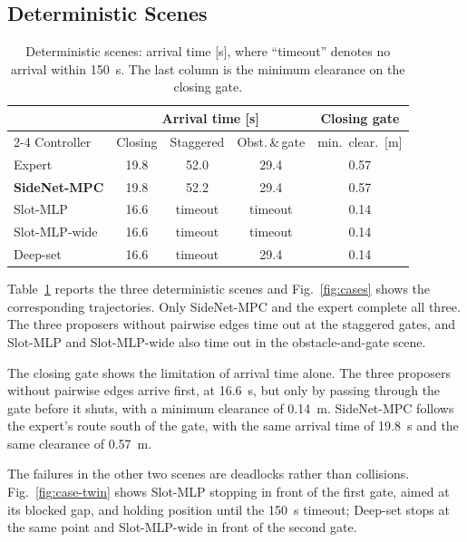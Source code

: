 \documentclass{article}
\theoremstyle{definition}
\begin{document}
\subsection{\texorpdfstring{Deterministic Scenes}{Deterministic Scenes}}
\label{sec:cases}

\begin{table}[t]
\caption{Deterministic scenes: arrival time [s], where ``timeout'' denotes no
arrival within \SI{150}{s}. The last column is the minimum
clearance on the closing gate.}
\label{tab:cases}
\centering
\footnotesize
\setlength{\tabcolsep}{4.0pt}\renewcommand{\arraystretch}{1.15}
\begin{tabular}{lcccc}
\toprule
& \multicolumn{3}{c}{Arrival time [s]} & Closing gate\\
\cmidrule(lr){2-4}
Controller & Closing & Staggered & Obst.\,\&\,gate & min.\ clear.\ [m]\\
\midrule
\rowcolor{gray!15}
Expert & 19.8 & 52.0 & 29.4 & 0.57\\
\midrule
\textbf{SideNet-MPC} & 19.8 & 52.2 & 29.4 & 0.57\\
Slot-MLP & 16.6 & timeout & timeout & 0.14\\
Slot-MLP-wide & 16.6 & timeout & timeout & 0.14\\
Deep-set & 16.6 & timeout & 29.4 & 0.14\\
\bottomrule
\end{tabular}
\end{table}

Table~\ref{tab:cases} reports the three deterministic scenes and
Fig.~\ref{fig:cases} shows the corresponding trajectories. Only SideNet-MPC and the expert complete all three. The three proposers without pairwise edges time out at the staggered gates, and Slot-MLP and Slot-MLP-wide also time out in the obstacle-and-gate scene.

The closing gate shows the limitation of arrival time alone. The three proposers without pairwise edges arrive first, at \SI{16.6}{s}, but only by passing through the gate before it shuts, with a minimum clearance of \SI{0.14}{m}. SideNet-MPC follows the expert's route south of the gate, with the same arrival time of \SI{19.8}{s} and the same clearance of \SI{0.57}{m}.

The failures in the other two scenes are deadlocks rather than collisions. Fig.~\ref{fig:case-twin}
shows Slot-MLP stopping in front of the first gate, aimed at its blocked gap, and holding position until the \SI{150}{s} timeout; Deep-set stops at the
same point and Slot-MLP-wide in front of the second gate.
\end{document}
